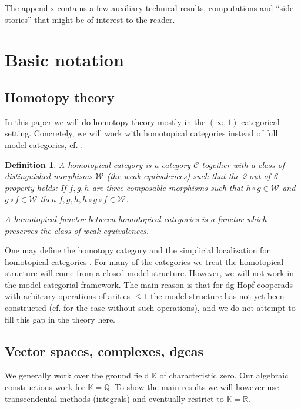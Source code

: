 \documentclass[a4paper]{amsart}
\theoremstyle{plain}
\newtheorem{defi}[thm]{Definition}
\theoremstyle{definition}
\newcommand{\R}{{\mathbb{R}}}
\newcommand{\K}{{\mathbb{K}}}
\newcommand{\Q}{{\mathbb{Q}}}
\newcommand{\mC}{{\mathcal{C}}}
\newcommand{\mW}{\mathcal{W}}
\begin{document}
The appendix contains a few auxiliary technical results, computations and ``side stories'' that might be of interest to the reader. 


\section{Basic notation}\label{sec:basic notation}

\subsection{Homotopy theory}
In this paper we will do homotopy theory mostly in the $(\infty,1)$-categorical setting. Concretely, we will work with homotopical categories instead of full model categories, cf. \cite{Riehl}.
\begin{defi}
 A homotopical category is a category $\mC$ together with a class of distinguished morphisms $\mW$ (the \emph{weak equivalences}) such that the 2-out-of-6 property holds:
If $f,g,h$ are three composable morphisms such that $h\circ g\in \mW$ and $g\circ f\in \mW$ then $f,g,h,h\circ g\circ f\in \mW$.

A homotopical functor between homotopical categories is a functor which preserves the class of weak equivalences.
\end{defi}
One may define the homotopy category and the simplicial localization for homotopical categories \cite{Riehl, DK1,DK2}.
For many of the categories we treat the homotopical structure will come from a closed model structure.
However, we will not work in the model categorial framework. The main reason is that for dg Hopf cooperads with arbitrary operations of arities $\leq 1$ the model structure has not yet been constructed (cf. \cite{F} for the case without such operations), and we do not attempt to fill this gap in the theory here.



\subsection{Vector spaces, complexes, dgcas}\label{sec:vector spaces complexes}

We generally work over the ground field $\K$ of characteristic zero.
Our algebraic constructions work for $\K=\Q$. To show the main results we will however use transcendental methods (integrals) and eventually restrict to $\K=\R$.
\end{document}
